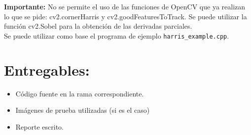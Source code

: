 \documentclass[letterpaper,11pt]{article}
\begin{document}
\textbf{Importante:} No se permite el uso de las funciones de OpenCV que ya realizan lo que se pide: cv2.cornerHarris y cv2.goodFeaturesToTrack. Se puede utilizar la función cv2.Sobel para la obtención de las derivadas parciales.
\[\]
Se puede utilizar como base el programa de ejemplo \texttt{harris\_example.cpp}.

\section*{Entregables:}
\begin{itemize}
\item Código fuente en la rama correspondiente. 
\item Imágenes de prueba utilizadas (si es el caso)
\item Reporte escrito.
\end{itemize}
\end{document}
